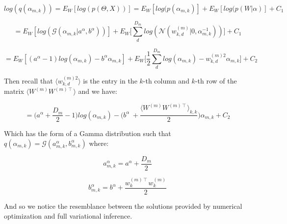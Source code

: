 \documentclass{article}
\begin{document}
$$log(q(\alpha_{m,k})) = E_{W}[log(p(\Theta,X))] = E_{W}[log(p(\alpha_{m,k})] + E_{W}[log(p(W|\alpha)] + C_1$$

$$ = E_{W}[log(\mathcal{G}(\alpha_{m,k}|a^\alpha,b^\alpha))] +  E_{W}\bigg[\sum_{d}^{D_m}{log(\mathcal{N}(w_{k,d}^{(m)}|0, \alpha_{m,k}^{-1}))}\bigg]+C_1$$

$$= E_W[(a^\alpha-1)log(\alpha_{m,k}) - b^\alpha\alpha_{m,k}] + E_W\bigg[\frac{1}{2}\sum_d^{D_m}{log(\alpha_{m,k}) - w_{k,d}^{(m)2} \alpha_{m,k} }\bigg] + C_2$$

Then recall that $\langle w_{k,d}^{(m)2}\rangle$ is the entry in the $k$-th column and $k$-th row of the matrix $\langle W^{(m)}W^{(m)\intercal}\rangle$ and we have:

$$= \bigg(a^\alpha+\frac{D_m}{2}-1 \bigg)log(\alpha_{m,k}) - \bigg(b^\alpha\ + \frac{\langle W^{(m)}W^{(m)\intercal}\rangle_{k,k}}{2} \bigg) \alpha_{m,k} + C_2$$

Which has the form of a Gamma distribution such that $q(\alpha_{m,k}) = \mathcal{G}(a_{m,k}^\alpha, b_{m,k}^\alpha)$ where:

$$a_{m,k}^\alpha = a^\alpha+\frac{D_m}{2}$$

$$b_{m,k}^\alpha = b^\alpha + \frac{w_k^{(m)\intercal}w_k^{(m)}}{2}$$

And so we notice the resemblance between the solutions provided by numerical optimization and full variational inference.
\end{document}
